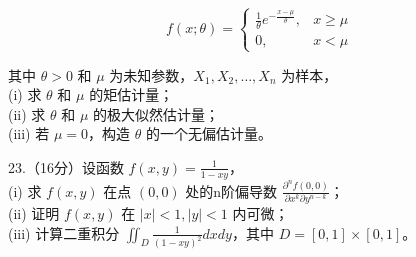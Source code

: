 \documentclass[UTF8]{ctexart}
\begin{document}
\[f(x;\theta) = \begin{cases} 
\frac{1}{\theta} e^{-\frac{x-\mu}{\theta}}, & x \geq \mu \\
0, & x < \mu 
\end{cases}\]

其中 \( \theta > 0 \) 和 \( \mu \)
为未知参数，\( X_1, X_2, \dots, X_n \) 为样本，\\
(i) 求 \( \theta \) 和 \( \mu \) 的矩估计量；\\
(ii) 求 \( \theta \) 和 \( \mu \) 的极大似然估计量；\\
(iii) 若 \( \mu = 0 \)，构造 \( \theta \) 的一个无偏估计量。

23.（16分）设函数 \( f(x,y) = \frac{1}{1 - xy} \)，\\
(i) 求 \( f(x,y) \) 在点 \( (0,0) \) 处的n阶偏导数
\( \frac{\partial^n f(0,0)}{\partial x^k \partial y^{n-k}} \)；\\
(ii) 证明 \( f(x,y) \) 在 \( |x| < 1, |y| < 1 \) 内可微；\\
(iii) 计算二重积分 \( \iint_{D} \frac{1}{(1 - xy)^2} dxdy \)，其中
\( D = [0,1] \times [0,1] \)。
\end{document}
